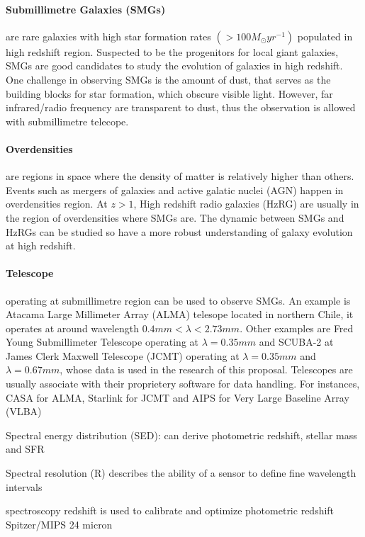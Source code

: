 \documentclass{article}
\begin{document}
\paragraph{Submillimetre Galaxies (SMGs)} are rare galaxies with high star formation rates $(>100M_\odot yr^{-1})$ \cite{DaCunha2021} populated in high redshift region. Suspected to be the progenitors for local giant galaxies, SMGs are good candidates to study the evolution of galaxies in high redshift. One challenge in observing SMGs is the amount of dust, that serves as the building blocks for star formation, which obscure visible light. However, far infrared/radio frequency are transparent to dust, thus the observation is allowed with submillimetre telecope. 

\paragraph{Overdensities} are regions in space where the density of matter is relatively higher than others. Events such as mergers of galaxies and active galatic nuclei (AGN) happen in overdensities region. At $z>1$, High redshift radio galaxies (HzRG) are usually in the region of overdensities where SMGs are. The dynamic between SMGs and HzRGs can be studied so have a more robust understanding of galaxy evolution at high redshift.

\paragraph{Telescope} operating at submillimetre region can be used to observe SMGs. An example is Atacama Large Millimeter Array (ALMA) telesope located in northern Chile, it operates at around wavelength $ 0.4mm < \lambda < 2.73mm$. Other examples are Fred Young Submillimeter Telescope operating at $\lambda=0.35mm$ and SCUBA-2 at James Clerk Maxwell Telescope (JCMT) operating at $\lambda=0.35mm$ and $\lambda=0.67mm$, whose data is used in the research of this proposal. Telescopes are usually associate with their proprietery software for data handling. For instances, CASA for ALMA, Starlink for JCMT and AIPS for Very Large Baseline Array (VLBA)

Spectral energy distribution (SED):
can derive photometric redshift, stellar mass and SFR

Spectral resolution (R) describes the ability of a sensor to define fine wavelength intervals

spectroscopy redshift is used to calibrate and optimize photometric redshift
Spitzer/MIPS 24 micron
\end{document}
